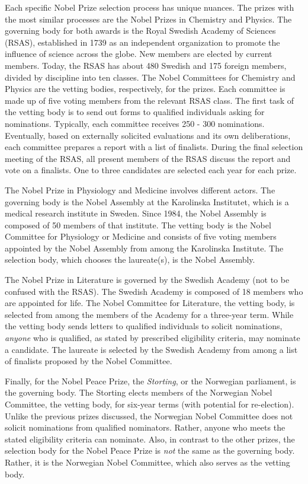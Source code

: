 \documentclass[11pt]{article}
\begin{document}
Each specific Nobel Prize selection process has unique nuances. The prizes with the most similar processes are the Nobel Prizes in Chemistry and Physics. The governing body for both awards is the Royal Swedish Academy of Sciences (RSAS), established in 1739 as an independent organization to promote the influence of science across the globe. New members are elected by current members. Today, the RSAS has about 480 Swedish and 175 foreign members, divided by discipline into ten classes. The Nobel Committees for Chemistry and Physics are the vetting bodies, respectively, for the prizes. Each committee is made up of five voting members from the relevant RSAS class. The first task of the vetting body is to send out forms to qualified individuals asking for nominations. Typically, each committee receives 250 - 300 nominations. Eventually, based on externally solicited evaluations and its own deliberations, each committee prepares a report with a list of finalists. During the final selection meeting of the RSAS, all present members of the RSAS discuss the report and vote on a finalists. One to three candidates are selected each year for each prize.

The Nobel Prize in Physiology and Medicine involves different actors. The governing body is the Nobel Assembly at the Karolinska Institutet, which is a medical research institute in Sweden. Since 1984, the Nobel Assembly is composed of 50 members of that institute. The vetting body is the Nobel Committee for Physiology or Medicine and consists of five voting members appointed by the Nobel Assembly from among the Karolinska Institute. The selection body, which chooses the laureate(s), is the Nobel Assembly.

The Nobel Prize in Literature is governed by the Swedish Academy (not to be confused with the RSAS). The Swedish Academy is composed of 18 members who are appointed for life.  The Nobel Committee for Literature, the vetting body, is selected from among the members of the Academy for a three-year term.  While the vetting body sends letters to qualified individuals to solicit nominations, \emph{anyone} who is qualified, as stated by prescribed eligibility criteria, may nominate a candidate. The laureate is selected by the Swedish Academy from among a list of finalists proposed by the Nobel Committee.

Finally, for the Nobel Peace Prize, the \emph{Storting}, or the Norwegian parliament, is the governing body.  The Storting elects members of the Norwegian Nobel Committee, the vetting body, for six-year terms (with potential for re-election).  Unlike the previous prizes discussed, the Norwegian Nobel Committee does not solicit nominations from qualified nominators. Rather, anyone who meets the stated eligibility criteria can nominate. Also, in contrast to the other prizes, the selection body for the Nobel Peace Prize is \emph{not} the same as the governing body. Rather, it is the Norwegian Nobel Committee, which also serves as the vetting body.
\end{document}
